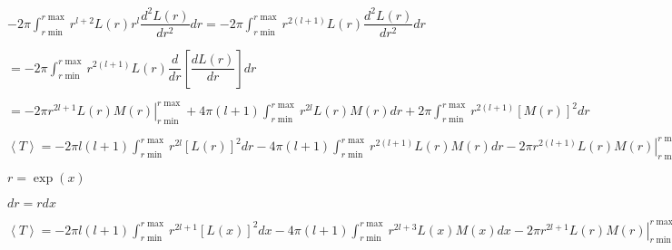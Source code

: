 \documentclass{jarticle}%
\begin{document}
$-2\pi%
{\displaystyle\int\nolimits_{r\min}^{r\max}}
r^{l+2}L\left(  r\right)  r^{l}\dfrac{d^{2}L\left(  r\right)  }{dr^{2}%
}dr=-2\pi%
{\displaystyle\int\nolimits_{r\min}^{r\max}}
r^{2\left(  l+1\right)  }L\left(  r\right)  \dfrac{d^{2}L\left(  r\right)
}{dr^{2}}dr$

$=-2\pi%
{\displaystyle\int\nolimits_{r\min}^{r\max}}
r^{2\left(  l+1\right)  }L\left(  r\right)  \dfrac{d}{dr}\left[
\dfrac{dL\left(  r\right)  }{dr}\right]  dr$

$=\left.  -2\pi r^{2l+1}L\left(  r\right)  M\left(  r\right)  \right\vert
_{r\min}^{r\max}+4\pi\left(  l+1\right)
{\displaystyle\int\nolimits_{r\min}^{r\max}}
r^{2l}L\left(  r\right)  M\left(  r\right)  dr+2\pi%
{\displaystyle\int\nolimits_{r\min}^{r\max}}
r^{2\left(  l+1\right)  }\left[  M\left(  r\right)  \right]  ^{2}dr$

$\left\langle T\right\rangle =-2\pi l\left(  l+1\right)
{\displaystyle\int\nolimits_{r\min}^{r\max}}
r^{2l}\left[  L\left(  r\right)  \right]  ^{2}dr-4\pi\left(  l+1\right)
{\displaystyle\int\nolimits_{r\min}^{r\max}}
r^{2\left(  l+1\right)  }L\left(  r\right)  M\left(  r\right)  dr-\left.  2\pi
r^{2\left(  l+1\right)  }L\left(  r\right)  M\left(  r\right)  \right\vert
_{r\min}^{r\max}+4\pi\left(  l+1\right)
{\displaystyle\int\nolimits_{r\min}^{r\max}}
r^{2l}L\left(  r\right)  M\left(  r\right)  dr+2\pi%
{\displaystyle\int\nolimits_{r\min}^{r\max}}
r^{2\left(  l+1\right)  }\left[  M\left(  r\right)  \right]  ^{2}dr$

$r=\exp\left(  x\right)  $

$dr=rdx$

$\left\langle T\right\rangle =-2\pi l\left(  l+1\right)
{\displaystyle\int\nolimits_{r\min}^{r\max}}
r^{2l+1}\left[  L\left(  x\right)  \right]  ^{2}dx-4\pi\left(  l+1\right)
{\displaystyle\int\nolimits_{r\min}^{r\max}}
r^{2l+3}L\left(  x\right)  M\left(  x\right)  dx-\left.  2\pi r^{2l+1}L\left(
r\right)  M\left(  r\right)  \right\vert _{r\min}^{r\max}+4\pi\left(
l+1\right)
{\displaystyle\int\nolimits_{r\min}^{r\max}}
r^{2\left(  l+1\right)  }L\left(  x\right)  M\left(  x\right)  dr+2\pi%
{\displaystyle\int\nolimits_{r\min}^{r\max}}
r^{2l+3}\left[  M\left(  x\right)  \right]  ^{2}dx$
\end{document}

